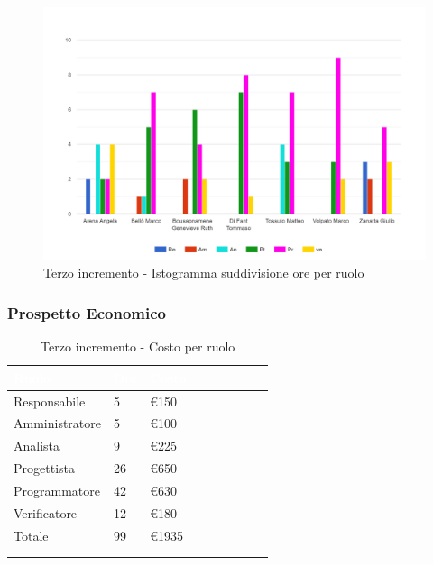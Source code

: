 {{      \begin{figure}[H]
        \includegraphics[width=15cm]{sezioni/images/terzo.png}
        \centering
        \caption{Terzo incremento - Istogramma suddivisione ore per ruolo}
     \end{figure}
    }

    \subsubsection{Prospetto Economico}
    {
        \setlength{\freewidth}{\dimexpr\textwidth-30\tabcolsep}
        \renewcommand{\arraystretch}{1.0}
        \setlength{\aboverulesep}{0pt}
        \setlength{\belowrulesep}{0pt}
        \begin{longtable}{C{.4\freewidth} C{.2\freewidth} C{.2\freewidth} C{.2\freewidth} C{.2\freewidth} C{.2\freewidth} C{.2\freewidth} C{.2\freewidth} C{.2\freewidth}}
          \toprule
        \textcolor{white}{\textbf{Ruolo}}&
        \textcolor{white}{\textbf{Ore}}&
        \textcolor{white}{\textbf{Costo}}\\
        \toprule
        \endhead
            
        Responsabile  & 5 & \euro150\\
        Amministratore  & 5 & \euro100 \\
        Analista &9 & \euro225\\
        Progettista &26 & \euro650\\
        Programmatore &42 & \euro630\\
        Verificatore &12 & \euro180\\
        Totale&99&\euro1935\\
        \bottomrule
      \\
        \caption{Terzo incremento - Costo per ruolo}


\end{longtable}}}
